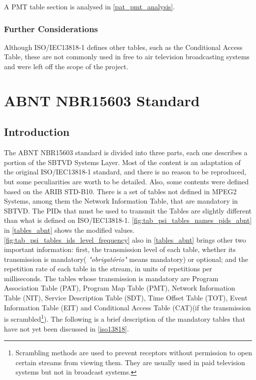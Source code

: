 \documentclass[
	12pt,				%
	openright,			%
	twoside,			%
	a4paper,			%
	brazil,
	french,				%
	english
	]{abntex2}
\begin{document}
A PMT table section is analysed in \autoref{pat_pmt_analysis}.

\subsection{Further Considerations}

Although ISO/IEC13818-1 defines other tables, such as the Conditional Access Table, these are not commonly used in free to air television broadcasting systems and were left off the scope of the project.

\chapter{ABNT NBR15603 Standard}
\label{nbr15603}

\section{Introduction}

The ABNT NBR15603 standard is divided into three parts, each one describes a portion of the SBTVD Systems Layer. Most of the content is an adaptation of the original ISO/IEC13818-1 standard, and there is no reason to be reproduced, but some peculiarities are worth to be detailed. Also, some contents were defined based on the ARIB STD-B10. There is a set of tables not defined in MPEG2 Systems, among them the Network Information Table, that are mandatory in SBTVD. The PIDs that must be used to transmit the Tables are slightly different than what is defined on ISO/IEC13818-1. \autoref{fig:tab_psi_tables_names_pids_abnt} in \autoref{tables_abnt} shows the modified values. \autoref{fig:tab_psi_tables_ids_level_frequency} also in \autoref{tables_abnt} brings other two important information: first, the transmission level of each table, whether its transmission is mandatory( \textit{"obrigatório"} means mandatory) or optional; and the repetition rate of each table in the stream, in units of repetitions per milliseconds. The tables whose transmission is mandatory are Program Association Table (PAT), Program Map Table (PMT), Network Information Table (NIT), Service Description Table (SDT), Time Offset Table (TOT), Event Information Table (EIT) and Conditional Access Table (CAT)(if the transmission is scrambled\footnote{Scrambling methods are used to prevent receptors without permission to open certain streams from viewing them. They are usually used in paid television systems but not in broadcast systems.}). The following is a brief description of the mandatory tables that have not yet been discussed in \autoref{iso13818}.
\end{document}
